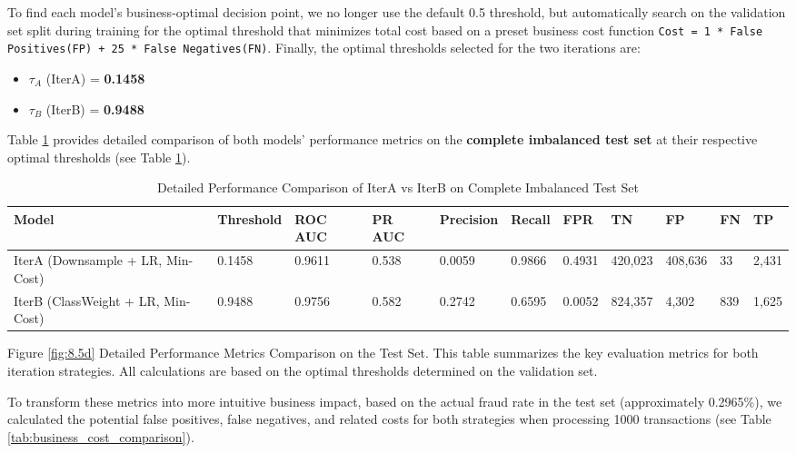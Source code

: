 \documentclass[sigplan,screen]{acmart}
\begin{document}
To find each model's business-optimal decision point, we no longer use the default 0.5 threshold, but automatically search on the validation set split during training for the optimal threshold that minimizes total cost based on a preset business cost function \texttt{Cost = 1 * False Positives(FP) + 25 * False Negatives(FN)}. Finally, the optimal thresholds selected for the two iterations are:

\begin{itemize}
\item $\tau_A$ (IterA) = \textbf{0.1458}
\item $\tau_B$ (IterB) = \textbf{0.9488}
\end{itemize}

Table \ref{tab:iteration_comparison} provides detailed comparison of both models' performance metrics on the \textbf{complete imbalanced test set} at their respective optimal thresholds (see Table \ref{tab:iteration_comparison}).

\begin{table}[h!]
    \centering
    \small
    \renewcommand{\arraystretch}{1.2}
    \begin{tabular}{|p{2.5cm}|p{1.2cm}|p{1.2cm}|p{1.2cm}|p{1.2cm}|p{1.2cm}|p{1.0cm}|p{1.0cm}|p{1.0cm}|p{1.0cm}|p{1.0cm}|}
    \hline
    \textbf{Model} & \textbf{Threshold} & \textbf{ROC AUC} & \textbf{PR AUC} & \textbf{Precision} & \textbf{Recall} & \textbf{FPR} & \textbf{TN} & \textbf{FP} & \textbf{FN} & \textbf{TP} \\
    \hline
    IterA (Downsample + LR, Min-Cost) & 0.1458 & 0.9611 & 0.538 & 0.0059 & 0.9866 & 0.4931 & 420,023 & 408,636 & 33 & 2,431 \\
    \hline
    IterB (ClassWeight + LR, Min-Cost) & 0.9488 & 0.9756 & 0.582 & 0.2742 & 0.6595 & 0.0052 & 824,357 & 4,302 & 839 & 1,625 \\
    \hline
    \end{tabular}
    \caption{Detailed Performance Comparison of IterA vs IterB on Complete Imbalanced Test Set}
    \label{tab:iteration_comparison}
\end{table}

Figure \ref{fig:8.5d} Detailed Performance Metrics Comparison on the Test Set. This table summarizes the key evaluation metrics for both iteration strategies. All calculations are based on the optimal thresholds determined on the validation set.

To transform these metrics into more intuitive business impact, based on the actual fraud rate in the test set (approximately 0.2965\%), we calculated the potential false positives, false negatives, and related costs for both strategies when processing 1000 transactions (see Table \ref{tab:business_cost_comparison}).
\end{document}
